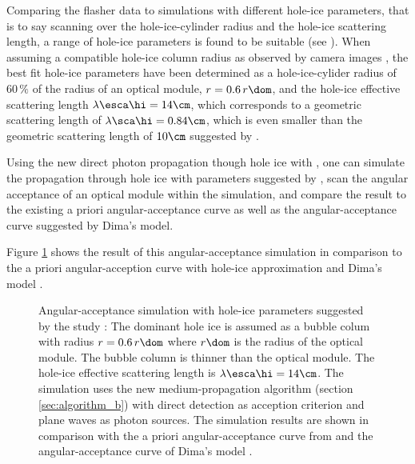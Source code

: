 Comparing the flasher data to simulations with different hole-ice parameters, that is to say scanning over the hole-ice-cylinder radius and the hole-ice scattering length, a range of hole-ice parameters is found to be suitable (see ). When assuming a compatible hole-ice column radius as observed by camera images , the best fit hole-ice parameters have been determined as a hole-ice-cylider radius of $60\,\%$ of the radius of an optical module, $r=0.6\,r\dom$, and the hole-ice effective scattering length $\lambda\esca\hi = 14\cm$, which corresponds to a geometric scattering length of $\lambda\sca\hi = 0.84\cm$, which is even smaller than the geometric scattering length of $10\cm$ suggested by . \cite{martinspicehddard}

Using the new direct photon propagation though hole ice with \clsim, one can simulate the propagation through hole ice with parameters suggested by , scan the angular acceptance of an optical module within the simulation, and compare the result to the existing a priori angular-acceptance curve as well as the angular-acceptance curve suggested by Dima's model.


Figure \ref{fig:ku3Zie8z} shows the result of this angular-acceptance simulation in comparison to the a priori angular-acception curve with hole-ice approximation \cite{icepaper} and Dima's model \cite{flasherdataderivedicemodels}.

\begin{figure}[htbp]
  \caption{Angular-acceptance simulation with hole-ice parameters suggested by the  study \cite{martinspicehddard}: The dominant hole ice is assumed as a bubble colum with radius $r = 0.6\,r\dom$ where $r\dom$ is the radius of the optical module. The bubble column is thinner than the optical module. The hole-ice effective scattering length is $\lambda\esca\hi = 14\cm$. The simulation uses the new medium-propagation algorithm (section \ref{sec:algorithm_b}) with direct detection as acception criterion and plane waves as photon sources. The simulation results are shown in comparison with the a priori angular-acceptance curve from \cite{icepaper} and the angular-acceptance curve of Dima's model \cite{flasherdataderivedicemodels}.}
  \label{fig:ku3Zie8z}
\end{figure}


